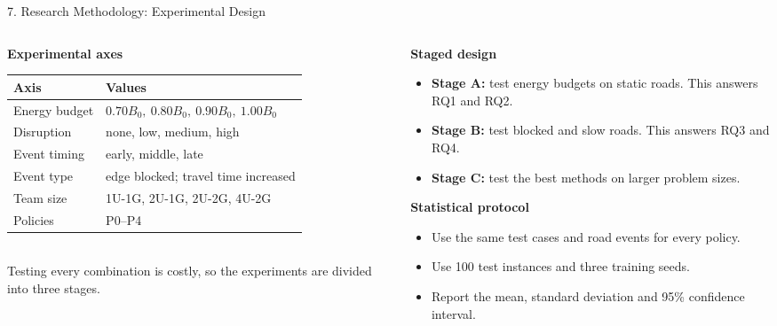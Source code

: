 \documentclass[aspectratio=169,10pt]{beamer}
\begin{document}
\begin{frame}{7. Research Methodology: Experimental Design}
\small
\begin{columns}[T]
\begin{column}{0.45\textwidth}
\textbf{Experimental axes}\\[1mm]
\scriptsize
\renewcommand{\arraystretch}{1.2}
\begin{tabular}{@{}P{1.9cm}P{3.9cm}@{}}
\toprule
Axis & Values\\
\midrule
Energy budget & $0.70B_0,\ 0.80B_0,\ 0.90B_0,\ 1.00B_0$\\
Disruption & none, low, medium, high\\
Event timing & early, middle, late\\
Event type & edge blocked; travel time increased\\
Team size & 1U-1G, 2U-1G, 2U-2G, 4U-2G\\
Policies & P0--P4\\
\bottomrule
\end{tabular}\\[2mm]
\small Testing every combination is costly, so the experiments are divided into three stages.
\end{column}
\begin{column}{0.52\textwidth}
\textbf{Staged design}
\begin{itemize}
  \item \textbf{Stage A:} test energy budgets on static roads. This answers RQ1 and RQ2.
  \item \textbf{Stage B:} test blocked and slow roads. This answers RQ3 and RQ4.
  \item \textbf{Stage C:} test the best methods on larger problem sizes.
\end{itemize}
\textbf{Statistical protocol}
\begin{itemize}
  \item Use the same test cases and road events for every policy.
  \item Use 100 test instances and three training seeds.
  \item Report the mean, standard deviation and 95\% confidence interval.
\end{itemize}
\end{column}
\end{columns}
\end{frame}
\end{document}
